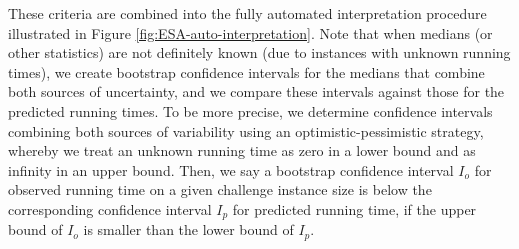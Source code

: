 \documentclass[aic]{iosart2x}
\begin{document}
These criteria are combined into the fully automated interpretation procedure illustrated in Figure \ref{fig:ESA-auto-interpretation}. Note that when medians (or other statistics) are not definitely known (due to instances with unknown running times), we create bootstrap confidence intervals for the medians that combine both sources of uncertainty, and we compare these intervals against those for the predicted running times. To be more precise, we determine confidence intervals combining both sources of variability using an optimistic-pessimistic strategy, whereby we treat an unknown running time as zero in a lower bound and as infinity in an upper bound. Then, we say a bootstrap confidence interval $I_o$ for observed running time on a given challenge instance size is below the corresponding confidence interval $I_p$ for predicted running time, if the upper bound of $I_o$ is smaller than the lower bound of $I_p$.
\end{document}
